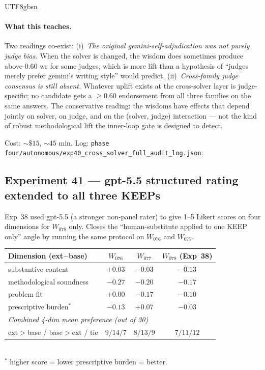 \documentclass{article}
\begin{document}
\begin{CJK*}{UTF8}{gbsn}
\paragraph{What this teaches.} Two readings co-exist:
(i)~\emph{The original gemini-self-adjudication was not
\emph{purely} judge bias.} When the solver is changed, the
wisdom does sometimes produce above-\(0.60\) wr for some judges,
which is more lift than a hypothesis of ``judges merely prefer
gemini's writing style'' would predict.
(ii)~\emph{Cross-family judge consensus is still absent.}
Whatever uplift exists at the cross-solver layer is judge-specific;
no candidate gets a \(\geq 0.60\) endorsement from all three
families on the same answers. The conservative reading: the
wisdoms have effects that depend jointly on solver, on judge, and
on the (solver, judge) interaction --- not the kind of robust
methodological lift the inner-loop gate is designed to detect.

Cost: \({\sim}\$15\), \({\sim}45\) min. Log:
\texttt{phase four/autonomous/exp40\_cross\_solver\_full\_audit\_log.json}.

\subsection{Experiment 41 — gpt-5.5 structured rating extended
to all three KEEPs}
\label{sec:exp41}

Exp~38 used gpt-5.5 (a stronger non-panel rater) to give 1--5
Likert scores on four dimensions for \(W_{078}\) only. Closes the
``human-substitute applied to one KEEP only'' angle by running
the same protocol on \(W_{076}\) and \(W_{077}\).

\begin{center}\small
\begin{tabular}{l c c c}
  \toprule
  Dimension (ext\(-\)base) & \(W_{076}\) & \(W_{077}\) & \(W_{078}\) (Exp~38) \\
  \midrule
  substantive content      & \(+0.03\) & \(-0.03\) & \(-0.13\) \\
  methodological soundness & \(-0.27\) & \(-0.20\) & \(-0.17\) \\
  problem fit              & \(+0.00\) & \(-0.17\) & \(-0.10\) \\
  prescriptive burden\(^*\) & \(-0.13\) & \(+0.07\) & \(-0.03\) \\
  \midrule
  \multicolumn{4}{l}{\emph{Combined 4-dim mean preference (out of 30)}}\\
  ext\(>\)base / base\(>\)ext / tie & \(9/14/7\) & \(8/13/9\) & \(7/11/12\) \\
  \bottomrule
\end{tabular}\\
\small\(^*\) higher score = lower prescriptive burden = better.
\end{center}


\end{CJK*}
\end{document}
